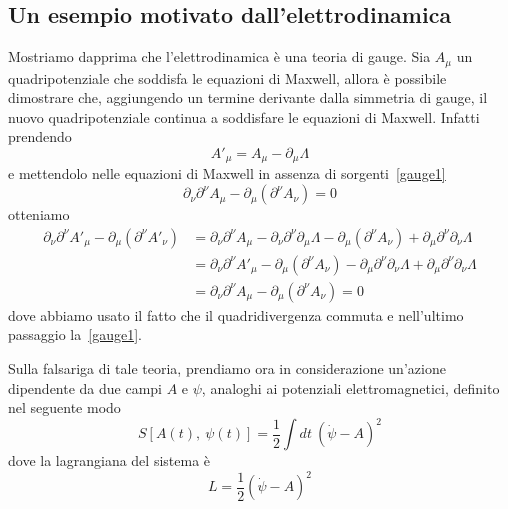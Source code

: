 \subsection{Un esempio motivato dall'elettrodinamica}

    Mostriamo dapprima che l'elettrodinamica è una teoria di gauge. Sia $A_\mu$ un quadripotenziale che soddisfa le equazioni di Maxwell, allora è possibile dimostrare che, aggiungendo un termine derivante dalla simmetria di gauge, il nuovo quadripotenziale continua a soddisfare le equazioni di Maxwell. Infatti prendendo 
    \begin{equation}\label{gaugeelettro}
        A'_\mu = A_\mu - \partial_\mu \Lambda
    \end{equation}
    e mettendolo nelle equazioni di Maxwell in assenza di sorgenti~\eqref{gauge1}
    \begin{equation*}
        \partial_\nu \partial^\nu A_\mu - \partial_\mu (\partial^\nu A_\nu) = 0
    \end{equation*}
    otteniamo 
    \begin{equation*}
    \begin{aligned}
        \partial_\nu \partial^\nu A'_\mu - \partial_\mu (\partial^\nu A'_\nu) & = \partial_\nu \partial^\nu A_\mu - \partial_\nu \partial^\nu \partial_\mu \Lambda - \partial_\mu (\partial^\nu A_\nu) + \partial_\mu \partial^\nu \partial_\nu \Lambda \\ & = \partial_\nu \partial^\nu A'_\mu - \partial_\mu (\partial^\nu A_\nu) - \partial_\mu \partial^\nu \partial_\nu \Lambda + \partial_\mu \partial^\nu \partial_\nu \Lambda \\ & = \partial_\nu \partial^\nu A_\mu - \partial_\mu (\partial^\nu A_\nu) = 0
    \end{aligned}
    \end{equation*}
    dove abbiamo usato il fatto che il quadridivergenza commuta e nell'ultimo passaggio la~\eqref{gauge1}.

    \hfill

    Sulla falsariga di tale teoria, prendiamo ora in considerazione un'azione dipendente da due campi $A$ e $\psi$, analoghi ai potenziali elettromagnetici, definito nel seguente modo
    \begin{equation*}
        S[A(t),~\psi(t)] = \frac{1}{2} \int dt ~ {(\dot \psi - A)}^2
    \end{equation*}
    dove la lagrangiana del sistema è
    \begin{equation*}
        L = \frac{1}{2} {(\dot \psi - A)}^2
    \end{equation*}
    
